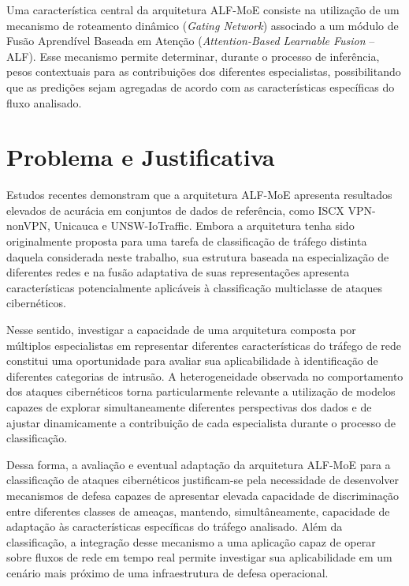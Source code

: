 \par{
Uma característica central da arquitetura ALF-MoE consiste na utilização de um mecanismo de roteamento dinâmico (\emph{Gating Network}) associado a um módulo de Fusão Aprendível Baseada em Atenção (\emph{Attention-Based Learnable Fusion} -- ALF). Esse mecanismo permite determinar, durante o processo de inferência, pesos contextuais para as contribuições dos diferentes especialistas, possibilitando que as predições sejam agregadas de acordo com as características específicas do fluxo analisado.
}

\section{Problema e Justificativa}
\label{sec:problema}

Estudos recentes demonstram que a arquitetura ALF-MoE apresenta resultados elevados de acurácia em conjuntos de dados de referência, como ISCX VPN-nonVPN, Unicauca e UNSW-IoTraffic. Embora a arquitetura tenha sido originalmente proposta para uma tarefa de classificação de tráfego distinta daquela considerada neste trabalho, sua estrutura baseada na especialização de diferentes redes e na fusão adaptativa de suas representações apresenta características potencialmente aplicáveis à classificação multiclasse de ataques cibernéticos.

Nesse sentido, investigar a capacidade de uma arquitetura composta por múltiplos especialistas em representar diferentes características do tráfego de rede constitui uma oportunidade para avaliar sua aplicabilidade à identificação de diferentes categorias de intrusão. A heterogeneidade observada no comportamento dos ataques cibernéticos torna particularmente relevante a utilização de modelos capazes de explorar simultaneamente diferentes perspectivas dos dados e de ajustar dinamicamente a contribuição de cada especialista durante o processo de classificação.

Dessa forma, a avaliação e eventual adaptação da arquitetura ALF-MoE para a classificação de ataques cibernéticos justificam-se pela necessidade de desenvolver mecanismos de defesa capazes de apresentar elevada capacidade de discriminação entre diferentes classes de ameaças, mantendo, simultâneamente, capacidade de adaptação às características específicas do tráfego analisado. Além da classificação, a integração desse mecanismo a uma aplicação capaz de operar sobre fluxos de rede em tempo real permite investigar sua aplicabilidade em um cenário mais próximo de uma infraestrutura de defesa operacional.

